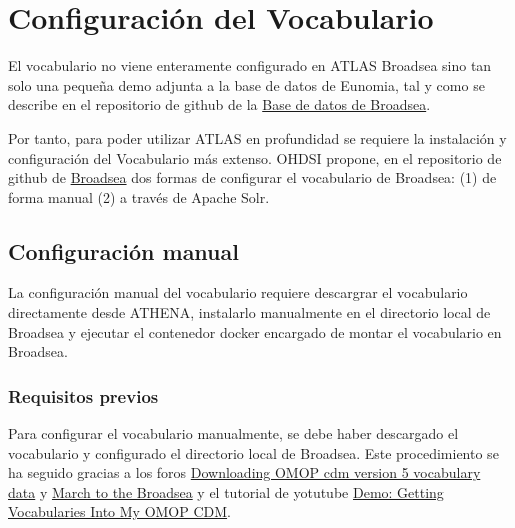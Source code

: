 \chapter{Configuración del Vocabulario}

El vocabulario no viene enteramente configurado en ATLAS Broadsea sino tan solo una pequeña demo adjunta a la base de datos de Eunomia, tal y como se describe en el repositorio de github de la \href{https://github.com/OHDSI/Broadsea-Atlasdb/tree/main}{ Base de datos de Broadsea}.

Por tanto, para poder utilizar ATLAS en profundidad se requiere la instalación y configuración del Vocabulario más extenso. OHDSI propone, en el repositorio de github de \href{https://github.com/OHDSI/Broadsea}{Broadsea} dos formas de configurar el vocabulario de Broadsea: (1) de forma manual (2) a través de Apache Solr. 

\section{Configuración manual}

La configuración manual del vocabulario requiere descargrar el vocabulario directamente desde ATHENA, instalarlo manualmente en el directorio local de Broadsea y ejecutar el contenedor docker encargado de montar el vocabulario en Broadsea. 


\subsection{Requisitos previos}

Para configurar el vocabulario manualmente,  se debe haber descargado el vocabulario y configurado el directorio local de Broadsea. Este procedimiento se ha seguido gracias a los foros \href{https://forums.ohdsi.org/t/downloading-omop-cdm-version-5-vocabulary-data/3321/3}{Downloading OMOP cdm version 5 vocabulary data} y \href{https://forums.ohdsi.org/t/march-to-the-broadsea/20576}{March to the Broadsea} y el tutorial de yotutube \href{https://www.youtube.com/watch?v=FCHxAQOBptE}{Demo: Getting Vocabularies Into My OMOP CDM}.

